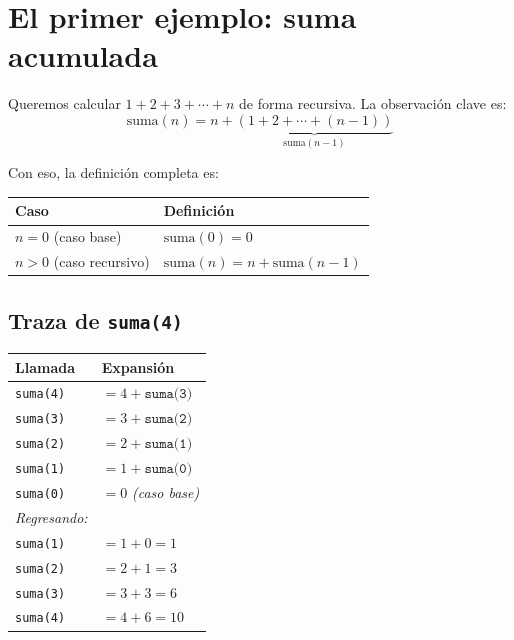 \documentclass[12pt, oneside]{article}
\begin{document}
\section{El primer ejemplo: suma acumulada}

Queremos calcular $1 + 2 + 3 + \cdots + n$ de forma recursiva.
La observación clave es:
\[
  \text{suma}(n) = n + \underbrace{(1 + 2 + \cdots + (n-1))}_{\text{suma}(n-1)}
\]

Con eso, la definición completa es:

\begin{center}
\begin{tabular}{ll}
  \toprule
  \textbf{Caso} & \textbf{Definición} \\
  \midrule
  $n = 0$ (caso base)      & $\text{suma}(0) = 0$ \\
  $n > 0$ (caso recursivo) & $\text{suma}(n) = n + \text{suma}(n-1)$ \\
  \bottomrule
\end{tabular}
\end{center}

\subsection{Traza de \texttt{suma(4)}}

\begin{ejemplo}
\begin{center}
\begin{tabular}{ll}
  \toprule
  \textbf{Llamada} & \textbf{Expansión} \\
  \midrule
  \texttt{suma(4)} & $= 4 + \texttt{suma(3)}$ \\
  \texttt{suma(3)} & $= 3 + \texttt{suma(2)}$ \\
  \texttt{suma(2)} & $= 2 + \texttt{suma(1)}$ \\
  \texttt{suma(1)} & $= 1 + \texttt{suma(0)}$ \\
  \texttt{suma(0)} & $= 0$ \quad\textit{(caso base)} \\
  \midrule
  \textit{Regresando:} & \\
  \texttt{suma(1)} & $= 1 + 0 = 1$ \\
  \texttt{suma(2)} & $= 2 + 1 = 3$ \\
  \texttt{suma(3)} & $= 3 + 3 = 6$ \\
  \texttt{suma(4)} & $= 4 + 6 = 10$ \\
  \bottomrule
\end{tabular}
\end{center}
\end{ejemplo}
\end{document}

